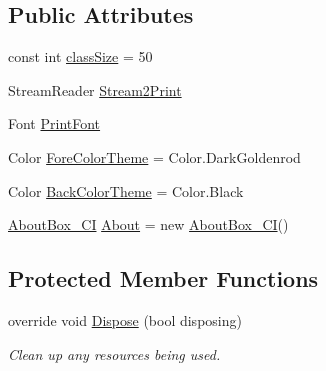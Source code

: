 \subsection*{\-Public \-Attributes}
\begin{DoxyCompactItemize}
\item 
const int \hyperlink{class_sr_p___classroom_inq_1_1frm_classrrom_inq_a78d9aab335edfe53d39036b9d89928a8}{class\-Size} = 50
\item 
\-Stream\-Reader \hyperlink{class_sr_p___classroom_inq_1_1frm_classrrom_inq_aa030f46a7915eae3a0b8b88661be51a8}{\-Stream2\-Print}
\item 
\-Font \hyperlink{class_sr_p___classroom_inq_1_1frm_classrrom_inq_a314e4a61ea8458c5198273335dcf0b5f}{\-Print\-Font}
\item 
\-Color \hyperlink{class_sr_p___classroom_inq_1_1frm_classrrom_inq_ac239384db4489bc4b8b2a4cee9280849}{\-Fore\-Color\-Theme} = \-Color.\-Dark\-Goldenrod
\item 
\-Color \hyperlink{class_sr_p___classroom_inq_1_1frm_classrrom_inq_a29b5dc6ea05e60bb2577a5bef3532d7b}{\-Back\-Color\-Theme} = \-Color.\-Black
\item 
\hyperlink{class_sr_p___classroom_inq_1_1_about_box___c_i}{\-About\-Box\-\_\-\-C\-I} \hyperlink{class_sr_p___classroom_inq_1_1frm_classrrom_inq_aa797137da7c6757a4fc98c07d41928db}{\-About} = new \hyperlink{class_sr_p___classroom_inq_1_1_about_box___c_i}{\-About\-Box\-\_\-\-C\-I}()
\end{DoxyCompactItemize}
\subsection*{\-Protected \-Member \-Functions}
\begin{DoxyCompactItemize}
\item 
override void \hyperlink{class_sr_p___classroom_inq_1_1frm_classrrom_inq_a7e6095e2ed04a53088833156d8d205b1}{\-Dispose} (bool disposing)
\begin{DoxyCompactList}\small\item\em \-Clean up any resources being used. \end{DoxyCompactList}\end{DoxyCompactItemize}
